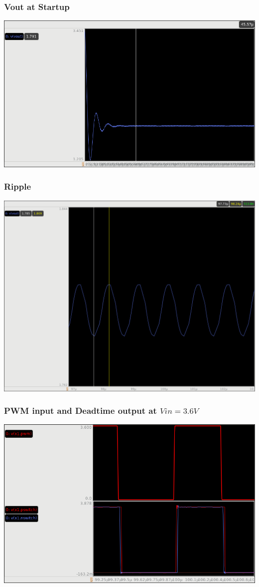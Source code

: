 \documentclass{beamer}
\begin{document}
\begin{frame}
  \frametitle{Vout at Startup }
  \includegraphics[scale=0.25]{startup-to-steady.png}
\end{frame}

\begin{frame}
  \frametitle{Ripple}
  \includegraphics[scale=0.25]{ripple.png}
\end{frame}

\begin{frame}
  \frametitle{PWM input and Deadtime output at $Vin = 3.6V$}
  \includegraphics[scale=0.25]{pwm-deadtime.png}
\end{frame}
\end{document}
